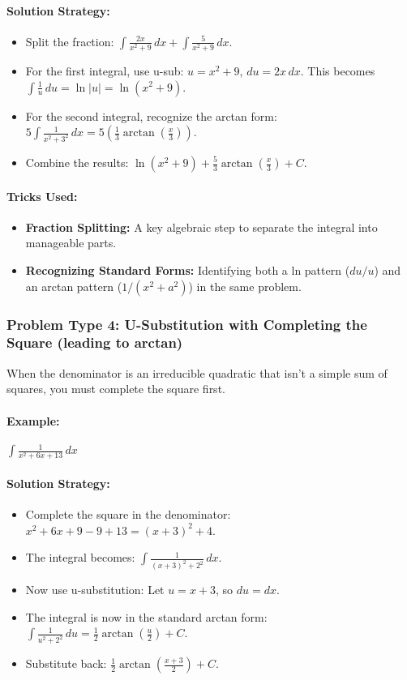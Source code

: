 \documentclass{article}
\begin{document}
\paragraph{Solution Strategy:}
\begin{itemize}
    \item Split the fraction: $\int \frac{2x}{x^2+9} \,dx + \int \frac{5}{x^2+9} \,dx$.
    \item For the first integral, use u-sub: $u = x^2+9$, $du = 2x \,dx$. This becomes $\int \frac{1}{u} \,du = \ln|u| = \ln(x^2+9)$.
    \item For the second integral, recognize the arctan form: $5 \int \frac{1}{x^2+3^2} \,dx = 5(\frac{1}{3}\arctan(\frac{x}{3}))$.
    \item Combine the results: $\ln(x^2+9) + \frac{5}{3}\arctan(\frac{x}{3}) + C$.
\end{itemize}
\paragraph{Tricks Used:}
\begin{itemize}
    \item \textbf{Fraction Splitting:} A key algebraic step to separate the integral into manageable parts.
    \item \textbf{Recognizing Standard Forms:} Identifying both a ln pattern ($du/u$) and an arctan pattern ($1/(x^2+a^2)$) in the same problem.
\end{itemize}

\subsubsection{Problem Type 4: U-Substitution with Completing the Square (leading to arctan)}
When the denominator is an irreducible quadratic that isn't a simple sum of squares, you must complete the square first.
\paragraph{Example:} $ \int \frac{1}{x^2+6x+13} \,dx $
\paragraph{Solution Strategy:}
\begin{itemize}
    \item Complete the square in the denominator: $x^2+6x+9-9+13 = (x+3)^2 + 4$.
    \item The integral becomes: $\int \frac{1}{(x+3)^2 + 2^2} \,dx$.
    \item Now use u-substitution: Let $u=x+3$, so $du=dx$.
    \item The integral is now in the standard arctan form: $\int \frac{1}{u^2+2^2} \,du = \frac{1}{2}\arctan(\frac{u}{2}) + C$.
    \item Substitute back: $\frac{1}{2}\arctan(\frac{x+3}{2}) + C$.
\end{itemize}
\end{document}
